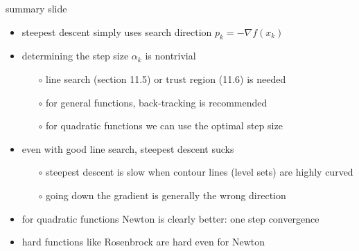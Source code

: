 \documentclass[10pt,hyperref]{beamer}
\newcommand{\grad}{\nabla}
\begin{document}
\begin{frame}{summary slide}

\begin{itemize}
\item steepest descent simply uses search direction $p_k = -\grad f(x_k)$
\item determining the step size $\alpha_k$ is nontrivial
    \begin{itemize}
    \item[$\circ$] line search (section 11.5) or trust region (11.6) is needed
    \item[$\circ$] for general functions, back-tracking is recommended
    \item[$\circ$] for quadratic functions we can use the optimal step size
    \end{itemize}
\item even with good line search, steepest descent sucks
    \begin{itemize}
    \item[$\circ$] steepest descent is slow when contour lines (level sets) are highly curved
    \item[$\circ$] going down the gradient is generally \alert{the wrong direction}
    \end{itemize}
\item for quadratic functions Newton is clearly better: one step convergence
\item hard functions like Rosenbrock are hard even for Newton
\end{itemize}
\end{frame}
\end{document}
